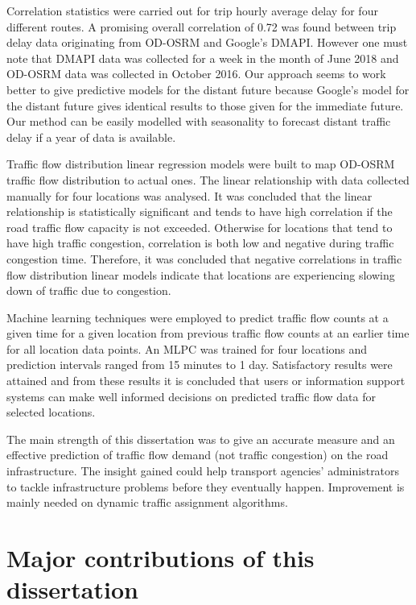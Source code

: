 \documentclass[12pt, a4paper]{report}
\theoremstyle{definition}
\theoremstyle{definition}%
\theoremstyle{definition}%
\theoremstyle{definition}%
\theoremstyle{definition}%
\theoremstyle{definition}%
\begin{document}
Correlation statistics were carried out for trip hourly average delay for four different routes. A promising overall correlation of 0.72 was found between trip delay data originating from OD-OSRM and Google's DMAPI. However one must note that DMAPI data was collected for a week in the month of June 2018 and OD-OSRM data was collected in October 2016. Our approach seems to work better to give predictive models for the distant future because Google's model for the distant future gives identical results to those given for the immediate future. Our method can be easily modelled with seasonality to forecast distant traffic delay if a year of data is available.

Traffic flow distribution linear regression models were built to map OD-OSRM traffic flow distribution to actual ones. The linear relationship with data collected manually for four locations was analysed. It was concluded that the linear relationship is statistically significant and tends to have high correlation if the road traffic flow capacity is not exceeded. Otherwise for locations that tend to have high traffic congestion, correlation is both low and negative during traffic congestion time. Therefore, it was concluded that negative correlations in traffic flow distribution linear models indicate that locations are experiencing slowing down of traffic due to congestion.

Machine learning techniques were employed to predict traffic flow counts at a given time for a given location from previous traffic flow counts at an earlier time for all location data points. An MLPC was trained for four locations and prediction intervals ranged from 15 minutes to 1 day. Satisfactory results were attained and from these results it is concluded that users or information support systems can make well informed decisions on predicted traffic flow data for selected locations.

The main strength of this dissertation was to give an accurate measure and an effective prediction of traffic flow demand (not traffic congestion) on the road infrastructure. The insight gained could help transport agencies' administrators to tackle infrastructure problems before they eventually happen. Improvement is mainly needed on dynamic traffic assignment algorithms.

\section{Major contributions of this dissertation} \label{section:major_contributions}
\end{document}
